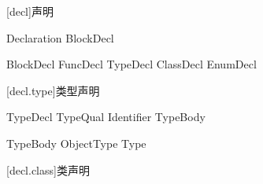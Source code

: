 
[decl]{声明}

\begin{bnf}{Declaration}
    BlockDecl \br
\end{bnf}

\begin{bnf}{BlockDecl}
    FuncDecl \br
    TypeDecl \br
    ClassDecl \br
    EnumDecl \br
\end{bnf}

[decl.type]{类型声明}

\begin{bnf}{TypeDecl}
    TypeQual\bnfs {} Identifier TypeBody
\end{bnf}

\begin{bnf}[TypeQual]
\end{bnf}

\begin{bnf}{TypeBody}
    ObjectType \br
    \terminal{=} Type
\end{bnf}

[decl.class]{类声明}
